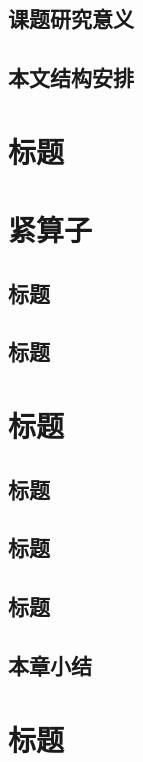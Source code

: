 \documentclass[openany,AutoFakeBold]{book}
\theoremstyle{definition}
\begin{document}
\section{课题研究意义}



\section{本文结构安排}



\chapter{标题}    %
\pagestyle{fancy}


\chapter{紧算子}
\pagestyle{fancy}


\section{标题}





\section{标题}


\chapter{标题}
\pagestyle{fancy}
\section{标题}

\section{标题}


\section{标题}


\section{本章小结}


\chapter{标题}
\pagestyle{fancy}
\end{document}

